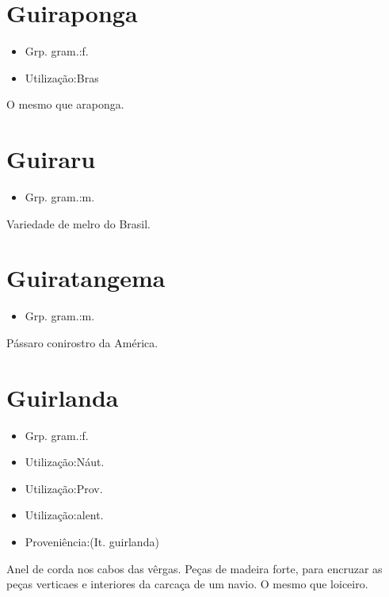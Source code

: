 \section{Guiraponga}
\begin{itemize}
\item {Grp. gram.:f.}
\end{itemize}
\begin{itemize}
\item {Utilização:Bras}
\end{itemize}
O mesmo que \textunderscore araponga\textunderscore .
\section{Guiraru}
\begin{itemize}
\item {Grp. gram.:m.}
\end{itemize}
Variedade de melro do Brasil.
\section{Guiratangema}
\begin{itemize}
\item {Grp. gram.:m.}
\end{itemize}
Pássaro conirostro da América.
\section{Guirlanda}
\begin{itemize}
\item {Grp. gram.:f.}
\end{itemize}
\begin{itemize}
\item {Utilização:Náut.}
\end{itemize}
\begin{itemize}
\item {Utilização:Prov.}
\end{itemize}
\begin{itemize}
\item {Utilização:alent.}
\end{itemize}
\begin{itemize}
\item {Proveniência:(It. \textunderscore guirlanda\textunderscore )}
\end{itemize}
Anel de corda nos cabos das vêrgas.
Peças de madeira forte, para encruzar as peças verticaes e interiores da carcaça de um navio.
O mesmo que \textunderscore loiceiro\textunderscore .
